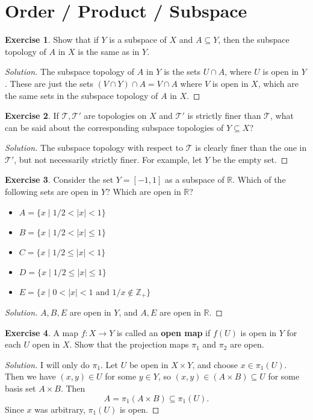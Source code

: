 \documentclass{article}
\theoremstyle{definition}
\newtheorem{exercise}{Exercise}[section]
\begin{document}
\addtocounter{section}{15}
\section{Order / Product / Subspace}

\begin{exercise}
  Show that if $Y$ is a subspace of $X$ and $A\subseteq Y$, then the subspace topology of $A$ in $X$ is the same as in $Y$.
\end{exercise}
\begin{proof}[Solution]
  The subspace topology of $A$ in $Y$ is the sets $U\cap A$, where $U$ is open in $Y$. These are just the sets $(V\cap Y)\cap A = V\cap A$ where $V$ is open in $X$, which are the same sets in the subspace topology of $A$ in $X$.
\end{proof}

\begin{exercise}
  If $\mathcal{T},\mathcal{T}'$ are topologies on $X$ and $\mathcal{T}'$ is strictly finer than $\mathcal{T}$, what can be said about the corresponding subspace topologies of $Y\subseteq X$?
\end{exercise}
\begin{proof}[Solution]
  The subspace topology with respect to $\mathcal{T}$ is clearly finer than the one in $\mathcal{T}'$, but not necessarily strictly finer. For example, let $Y$ be the empty set.
\end{proof}


\begin{exercise}
  Consider the set $Y=[-1,1]$ as a subspace of $\mathbb{R}$. Which of the following sets are open in $Y$? Which are open in $\mathbb{R}$?
  \begin{itemize}
    \item $A = \{x\mid 1/2 < |x| < 1\}$
    \item $B = \{x\mid 1/2 < |x| \le 1\}$
    \item $C = \{x\mid 1/2 \le |x| < 1\}$
    \item $D = \{x\mid 1/2 \le |x| \le 1\}$
    \item $E = \{x\mid 0 < |x| < 1 \text{ and } 1/x\notin\mathbb{Z}_+\}$
  \end{itemize}
\end{exercise}
\begin{proof}[Solution]
  $A,B,E$ are open in $Y$, and $A,E$ are open in $\mathbb{R}$.
\end{proof}


\begin{exercise}
  A map $f:X\to Y$ is called an \textbf{open map} if $f(U)$ is open in $Y$ for each $U$ open in $X$. Show that the projection maps $\pi_1$ and $\pi_2$ are open.
\end{exercise}
\begin{proof}[Solution]
  I will only do $\pi_1$. Let $U$ be open in $X\times Y$, and choose $x\in\pi_1(U)$. Then we have $(x,y)\in U$ for some $y\in Y$, so $(x,y)\in(A\times B)\subseteq U$ for some basis set $A\times B$. Then $$A = \pi_1(A\times B)\subseteq\pi_1(U).$$
  Since $x$ was arbitrary, $\pi_1(U)$ is open.
\end{proof}
\end{document}
